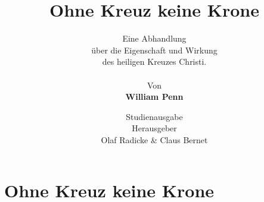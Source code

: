 \documentclass[pdftex,pagesize,9pt]{scrbook}
\begin{document}
\null\newpage

\author{
Eine Abhandlung \\
über die Eigenschaft und Wirkung
\\
des heiligen Kreuzes Christi.
\\
\\
Von
\\
\textbf{William Penn}
}

\title{Ohne Kreuz keine Krone}
\date{
\vspace{3cm}
Studienausgabe\\
\vfill
Herausgeber \\
 Olaf Radicke \& Claus Bernet
}

\maketitle

\frontmatter

\tableofcontents


\mainmatter



\setcounter{secnumdepth}{-2}
\part{Ohne Kreuz keine Krone}

\end{document}
